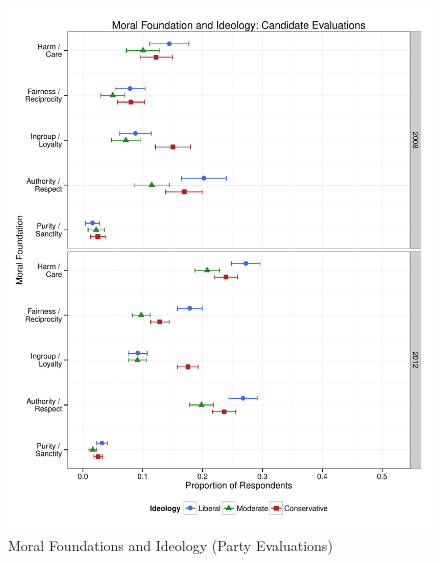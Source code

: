 \documentclass[12pt]{article}
\begin{document}
\begin{figure}\centering
\includegraphics[scale=.4]{../calc/fig/p2_mft_ideol_ca.pdf}
\caption{Moral Foundations and Ideology (Party Evaluations)}\label{fig:mft_ideol_pa}
\end{figure}
\end{document}
